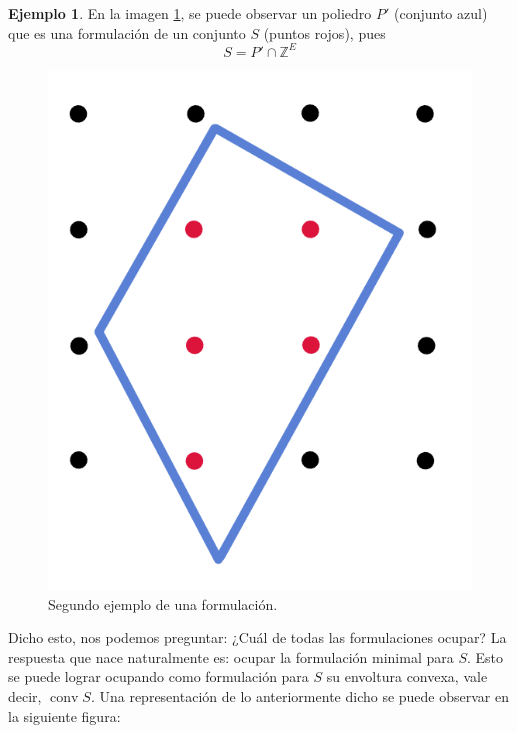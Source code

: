 \documentclass[10pt]{article}
\newcommand{\ZZ}{\mathbb Z}
\DeclareMathOperator{\conv}{conv}
\theoremstyle{plain}
\theoremstyle{definition}
\newtheorem{eje}{Ejemplo}
\begin{document}
\begin{eje} \label{eje:formulacion2}
En la imagen \ref{fig:formulacion2}, se puede observar un poliedro $P'$ (conjunto azul) que es una formulación de un conjunto $S$ (puntos rojos), pues $$S = P' \cap \ZZ^{E}$$ 
\begin{figure}[H] 
    \centering
    \includegraphics[scale=0.3]{formulacion2.png}
    \caption{Segundo ejemplo de una formulación.}
    \label{fig:formulacion2}
\end{figure}
\end{eje}

Dicho esto, nos podemos preguntar: ¿Cuál de todas las formulaciones ocupar? La respuesta que nace naturalmente es: ocupar la formulación minimal para $S$. Esto se puede lograr ocupando como formulación para $S$ su envoltura convexa, vale decir, $\conv S$. Una representación de lo anteriormente dicho se puede observar en la siguiente figura:
\end{document}
